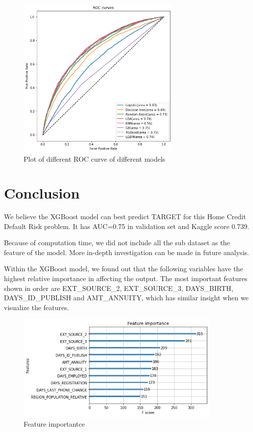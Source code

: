 \documentclass{article}
\begin{document}
\begin{figure}[H]
  \centering
  \includegraphics [width=8cm]{download4.png}
  \caption{Plot of different ROC curve of different models}
\end{figure}

\newpage


\section{Conclusion}

We believe the XGBoost model can best predict TARGET for this Home Credit Default Risk problem. It has AUC=0.75 in validation set and Kaggle score 0.739.		
	
Because of computation time, we did not include all the sub dataset as the feature of the model. More in-depth investigation can be made in future analysis.

Within the XGBoost model, we found out that the following variables have the highest relative importance in affecting the output. The most important features shown in order are EXT\_SOURCE\_2, EXT\_SOURCE\_3, DAYS\_BIRTH, DAYS\_ID\_PUBLISH and AMT\_ANNUITY, which has similar insight when we visualize the features.

\begin{figure}[H]
  \centering
  \includegraphics [width=10cm]{download6.png}
  \caption{Feature importantce}
\end{figure}
\end{document}
